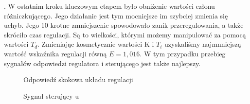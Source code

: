 . W ostatnim kroku kluczowym etapem było obniżenie wartości członu różniczkującego. Jego działanie jest tym mocniejsze im szybciej zmienia się uchyb. Jego 10-krotne zmniejszenie spowodowało zanik przeregulowania, a także skróciło czas regulacji. Są to wielkości, którymi możemy manipulować za pomocą wartości $T_{d}$. Zmieniając kosmetycznie wartości K i $T_{i}$ uzyskaliśmy najmnniejszą wartość wskaźnika regulacji równą $E=1,016$. W tym przypadku przebieg sygnałów odpowiedzi regulatora i sterującego jest także najlepszy. 
\begin{figure}[h]
    \centering
    \caption{Odpowiedź skokowa układu regulacji}
    \label{zad5_niegasnące_oscylacje}
\end{figure}

\begin{figure}[h]
    \centering
    \caption{Sygnał sterujący u}
    \label{zad2_stat_wykres}
\end{figure}
\FloatBarrier